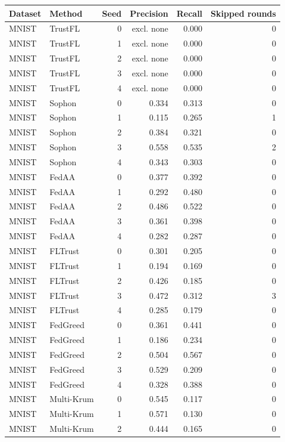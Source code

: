 \begin{tabular}{llrrrr}
\toprule
Dataset & Method & Seed & Precision & Recall & Skipped rounds \\
\midrule
MNIST & TrustFL & 0 & excl. none & 0.000 & 0 \\
MNIST & TrustFL & 1 & excl. none & 0.000 & 0 \\
MNIST & TrustFL & 2 & excl. none & 0.000 & 0 \\
MNIST & TrustFL & 3 & excl. none & 0.000 & 0 \\
MNIST & TrustFL & 4 & excl. none & 0.000 & 0 \\
MNIST & Sophon & 0 & 0.334 & 0.313 & 0 \\
MNIST & Sophon & 1 & 0.115 & 0.265 & 1 \\
MNIST & Sophon & 2 & 0.384 & 0.321 & 0 \\
MNIST & Sophon & 3 & 0.558 & 0.535 & 2 \\
MNIST & Sophon & 4 & 0.343 & 0.303 & 0 \\
MNIST & FedAA & 0 & 0.377 & 0.392 & 0 \\
MNIST & FedAA & 1 & 0.292 & 0.480 & 0 \\
MNIST & FedAA & 2 & 0.486 & 0.522 & 0 \\
MNIST & FedAA & 3 & 0.361 & 0.398 & 0 \\
MNIST & FedAA & 4 & 0.282 & 0.287 & 0 \\
MNIST & FLTrust & 0 & 0.301 & 0.205 & 0 \\
MNIST & FLTrust & 1 & 0.194 & 0.169 & 0 \\
MNIST & FLTrust & 2 & 0.426 & 0.185 & 0 \\
MNIST & FLTrust & 3 & 0.472 & 0.312 & 3 \\
MNIST & FLTrust & 4 & 0.285 & 0.179 & 0 \\
MNIST & FedGreed & 0 & 0.361 & 0.441 & 0 \\
MNIST & FedGreed & 1 & 0.186 & 0.234 & 0 \\
MNIST & FedGreed & 2 & 0.504 & 0.567 & 0 \\
MNIST & FedGreed & 3 & 0.529 & 0.209 & 0 \\
MNIST & FedGreed & 4 & 0.328 & 0.388 & 0 \\
MNIST & Multi-Krum & 0 & 0.545 & 0.117 & 0 \\
MNIST & Multi-Krum & 1 & 0.571 & 0.130 & 0 \\
MNIST & Multi-Krum & 2 & 0.444 & 0.165 & 0 \\

\end{tabular}
